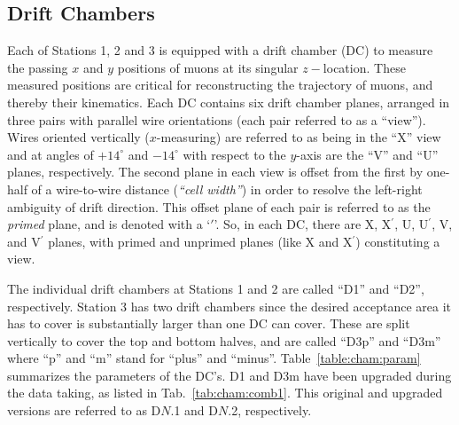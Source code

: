 \subsection{Drift Chambers}

Each of Stations 1, 2 and 3 is equipped with a drift chamber (DC) to measure the passing $x$ and $y$ positions of muons at its singular $z-$location. These measured positions are critical for reconstructing the trajectory of muons, and thereby their kinematics. Each DC contains six drift chamber planes, arranged in three pairs with parallel wire orientations (each pair referred to as a ``view''). Wires oriented vertically ($x$-measuring) are referred to as being in the ``X'' view and at angles of $+14^\circ$ and $-14^\circ$ with respect to the $y$-axis are the ``V'' and ``U'' planes, respectively. The second plane in each view is offset from the first by one-half of a wire-to-wire distance (\emph{``cell width''}) in order to resolve the left-right ambiguity of drift direction. This offset plane of each pair is referred to as the \emph{primed} plane, and is denoted with a `$\prime$'. So, in each DC, there are X, X$^\prime$, U, U$^\prime$, V, and V$^\prime$ planes, with primed and unprimed planes (like X and X$^\prime$) constituting a view.

The individual drift chambers at Stations 1 and 2 are called ``D1'' and ``D2'', respectively. Station 3 has two drift chambers since the desired acceptance area it has to cover is substantially larger than one DC can cover. These are split vertically to cover the top and bottom halves, and are called ``D3p'' and ``D3m'' where ``p'' and ``m'' stand for ``plus'' and ``minus''. Table~\ref{table:cham:param} summarizes the parameters of the DC's. D1 and D3m have been upgraded during the data taking, as listed in Tab.~\ref{tab:cham:comb1}. This original and upgraded versions are referred to as D$N$.1 and D$N$.2, respectively.

